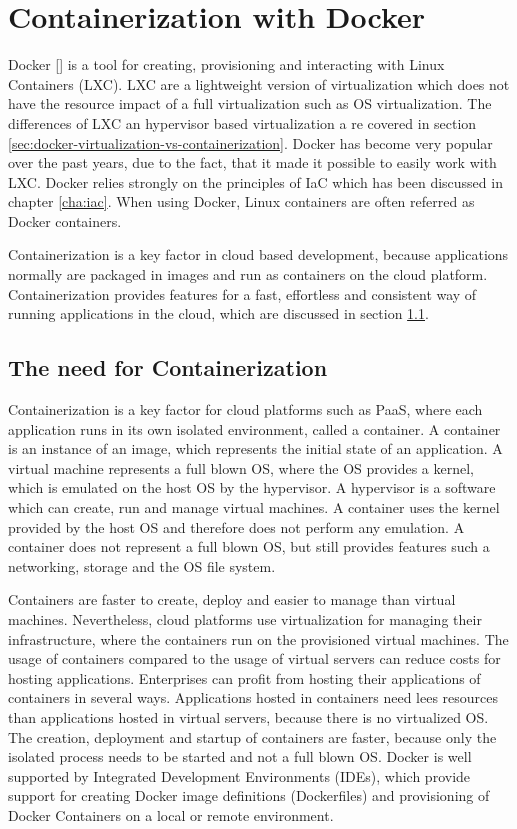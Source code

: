 \chapter{Containerization with Docker}
\label{cha:containerization-docker}
Docker [\cite{Docker2018}] is a tool for creating, provisioning and interacting with Linux Containers (LXC). LXC are a lightweight version of virtualization which does not have the resource impact of a full virtualization such as OS virtualization. The differences of LXC an hypervisor based virtualization a re covered in section \ref{sec:docker-virtualization-vs-containerization}. Docker has become very popular over the past years, due to the fact, that it made it possible to easily work with LXC. Docker relies strongly on the principles of IaC which has been discussed in chapter \ref{cha:iac}. When using Docker, Linux containers are often referred as Docker containers.

Containerization is a key factor in cloud based development, because applications normally are packaged in images and run as containers on the cloud platform. Containerization provides features for a fast, effortless and consistent way of running applications in the cloud, which are discussed in section \ref{sec:docker-need-for-containerization}.

\section{The need for Containerization}
\label{sec:docker-need-for-containerization}
Containerization is a key factor for cloud platforms such as PaaS, where each application runs in its own isolated environment, called a container. A container is an instance of an image, which represents the initial state of an application. A virtual machine represents a full blown OS, where the OS provides a kernel, which is emulated on the host OS by the hypervisor. A hypervisor is a software which can create, run and manage virtual machines. A container uses the kernel provided by the host OS and therefore does not perform any emulation. A container does not represent a full blown OS, but still provides features such a networking, storage and the OS file system.  

Containers are faster to create, deploy and easier to manage than virtual machines. Nevertheless, cloud platforms use virtualization for managing their infrastructure, where the containers run on the provisioned virtual machines. The usage of containers compared to the usage of virtual servers can reduce costs for hosting applications. Enterprises can profit from hosting their applications of containers in several ways. Applications hosted in containers need lees resources than applications hosted in virtual servers, because there is no virtualized OS. The creation, deployment and startup of containers are faster, because only the isolated process needs to be started and not a full blown OS. Docker is well supported by Integrated Development Environments (IDEs), which provide support for creating Docker image definitions (Dockerfiles) and provisioning of Docker Containers on a local or remote environment.

